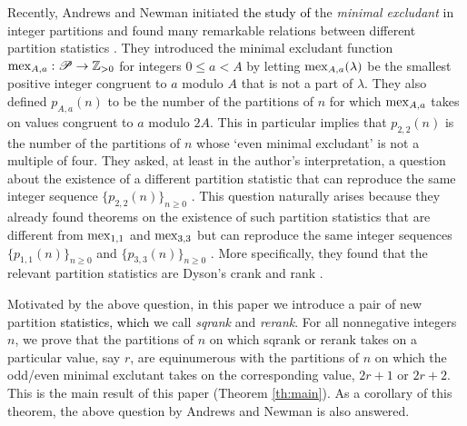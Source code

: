 \documentclass[sn-mathphys-num]{sn-jnl}%
\newcommand{\red}[1]{\textcolor{black}{#1}}
\theoremstyle{thmstyleone}%
\theoremstyle{thmstyletwo}%
\theoremstyle{thmstylethree}%
\begin{document}
Recently, Andrews and Newman initiated \red{the study of} the {\em minimal excludant} in
integer partitions and found many remarkable relations between 
different partition statistics \cite{AN2020}.
%
They introduced the {minimal excludant} function 
${\rm mex}_{A,a} : \mathscr{P} \rightarrow \mathbb{Z}_{>0}$ 
{for integers $0 \leq a < A$}
by letting
${\rm mex}_{A,a}(\lambda)$ be the smallest positive
integer congruent to $a$ modulo $A$ that is not a part of $\lambda$.
They also defined
$p_{A,a}(n)$ to be the number of the partitions of $n$ {for} which
${\rm mex}_{A,a}$ takes on values congruent to $a$ modulo $2A$.
This in particular implies that $p_{2,2}(n)$ is the number of the partitions of $n$
whose `even minimal excludant' is not a multiple of four.
%
They asked, at least in the author's interpretation,
a question about the existence of
a different partition statistic that can 
reproduce the same integer sequence $\{ p_{2,2}(n) \}_{n \geq 0}$ \cite[p.~9, Questions II]{AN2020}.
This question naturally arises because
they {already} found theorems
on the existence of
such partition statistics that are different from ${\rm mex}_{1,1}$ and ${\rm mex}_{3,3}$ but
can reproduce the same integer sequences $\{ p_{1,1}(n) \}_{n \geq 0}$ and 
$\{ p_{3,3}(n) \}_{n \geq 0}$ \cite[Theorems 2 and 3]{AN2020}.
More specifically, they found that
the relevant partition statistics are Dyson's crank and rank \cite{Dyson1944, AG1988}.
%

Motivated by {the above} question,
in this paper
we introduce a pair of new partition \red{statistics, which} 
we call {\em sqrank} and {\em rerank}.
For all nonnegative integers $n$, we prove that
the partitions of $n$ on which sqrank or rerank takes on a particular value, say $r$, are equinumerous with the partitions of $n$ on which the
odd/even minimal exclutant takes on the corresponding value, $2r+1$ or $2r+2$. 
This is the main result of this paper (Theorem \ref{th:main}).
%
As a corollary of this theorem, the above question by Andrews and Newman is also answered.
\end{document}
